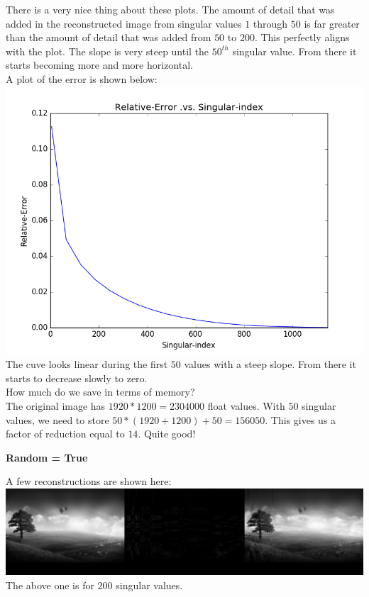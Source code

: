 \documentclass{article}
\begin{document}
There is a very nice thing about these plots. The amount of detail that was added in the reconstructed image from singular values $1$ through $50$ is far greater than the amount of detail that was added from $50$ to $200$. This perfectly aligns with the plot. The slope is very steep until the $50^{th}$ singular value. From there it starts becoming more and more horizontal.\\

A plot of the error is shown below:\\

\includegraphics[width =\textwidth]{SVD/a/Rect/False/error.png}\\

The cuve looks linear during the first $50$ values with a steep slope. From there it starts to decrease slowly to zero.\\

How much do we save in terms of memory?\\
The original image has $1920 * 1200 = 2304000$ float values. With $50$ singular values, we need to store $50 * (1920 + 1200) + 50 = 156050$. This gives us a factor of reduction equal to $14$. Quite good! 


\newpage
\textbf{Random = True}

A few reconstructions are shown here:\\

\includegraphics[width =\textwidth]{SVD/a/Rect/True/recon0200.png}\\
The above one is for $200$ singular values.\\
\end{document}
